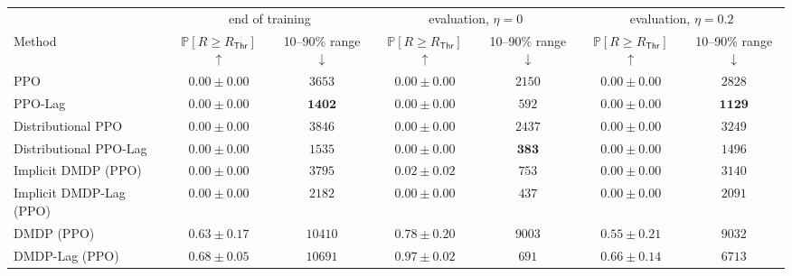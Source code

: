 \begin{tabular*}{\linewidth}{@{\extracolsep{\fill}}lcccccc@{}}
\toprule
 & \multicolumn{2}{c}{end of training} & \multicolumn{2}{c}{evaluation, $\eta=0$} & \multicolumn{2}{c}{evaluation, $\eta=0.2$} \\
\cmidrule(lr){2-3}\cmidrule(lr){4-5}\cmidrule(lr){6-7}
Method & $\mathbb{P}[R\geq R_{\mathsf{Thr}}]$ $\uparrow$ & 10--90\% range $\downarrow$ & $\mathbb{P}[R\geq R_{\mathsf{Thr}}]$ $\uparrow$ & 10--90\% range $\downarrow$ & $\mathbb{P}[R\geq R_{\mathsf{Thr}}]$ $\uparrow$ & 10--90\% range $\downarrow$ \\
\midrule
PPO & $0.00\pm0.00$ & $3653$ & $0.00\pm0.00$ & $2150$ & $0.00\pm0.00$ & $2828$ \\
PPO-Lag & $0.00\pm0.00$ & $\bm{1402}$ & $0.00\pm0.00$ & $592$ & $0.00\pm0.00$ & $\bm{1129}$ \\
Distributional PPO & $0.00\pm0.00$ & $3846$ & $0.00\pm0.00$ & $2437$ & $0.00\pm0.00$ & $3249$ \\
Distributional PPO-Lag & $0.00\pm0.00$ & $1535$ & $0.00\pm0.00$ & $\bm{383}$ & $0.00\pm0.00$ & $1496$ \\
Implicit DMDP (PPO) & $0.00\pm0.00$ & $3795$ & $0.02\pm0.02$ & $753$ & $0.00\pm0.00$ & $3140$ \\
Implicit DMDP-Lag (PPO) & $0.00\pm0.00$ & $2182$ & $0.00\pm0.00$ & $437$ & $0.00\pm0.00$ & $2091$ \\
DMDP (PPO) & $0.63\pm0.17$ & $10410$ & $0.78\pm0.20$ & $9003$ & $0.55\pm0.21$ & $9032$ \\
DMDP-Lag (PPO) & $\bm{0.68\pm0.05}$ & $10691$ & $\bm{0.97\pm0.02}$ & $691$ & $\bm{0.66\pm0.14}$ & $6713$ \\
\bottomrule
\end{tabular*}
